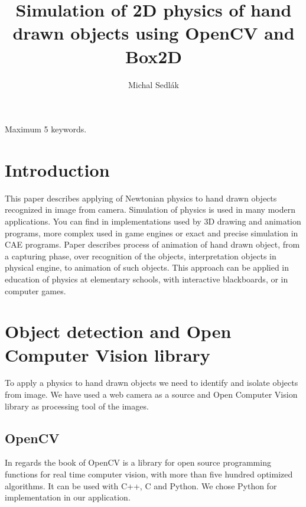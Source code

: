 \documentclass{ifacconf}
\begin{document}
\begin{frontmatter}
\title{Simulation of 2D physics of hand drawn objects using OpenCV and Box2D}
\author[Bratislava]{Michal Sedlák}
\address[Bratislava]{Faculty of Electrical Engineering and Information
Technology, Slovak University of Technology, Ilkovičova 3, 812 19 Bratislava,
Slovakia
\\
(e-mail: michal.sedlak@stuba.sk)}
\begin{abstract}

\end{abstract}
\begin{keyword}
Maximum 5 keywords.
\end{keyword}
\end{frontmatter}

\section{Introduction}
This paper describes applying of Newtonian physics to hand drawn objects
recognized in image from camera. Simulation of physics is used in many modern
applications. You can find in implementations used by 3D drawing and animation
programs, more complex used in game engines or exact and precise simulation in
CAE programs. Paper describes process of animation of hand drawn object, from a
capturing phase, over recognition of the objects, interpretation objects in
physical engine, to animation of such objects. This approach can be applied in
education of physics at elementary schools, with interactive blackboards, or in
computer games.

\section{Object detection and Open Computer Vision library}
To apply a physics to hand drawn objects we need to identify and isolate
objects from image. We have used a web camera as a source and Open Computer
Vision library as processing tool of the images.

\subsection{OpenCV}
In regards the book of \cite{OpenCV} OpenCV  is a library for open source
programming functions for real time computer vision, with more than five hundred
optimized algorithms. It can be used with C++, C and Python. We chose Python for
implementation in our application.
\end{document}
